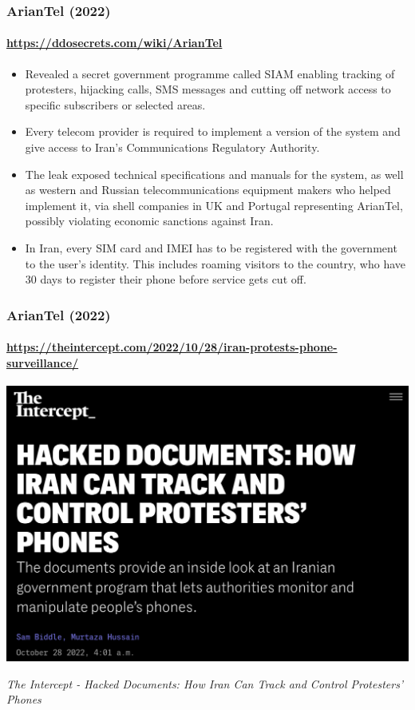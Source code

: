 \documentclass[aspectratio=169,usenames,dvipsnames]{beamer}
\begin{document}
\begin{frame}
  \frametitle{ArianTel (2022)}
  \framesubtitle{\url{https://ddosecrets.com/wiki/ArianTel}}

  \begin{itemize}[<+->]
    \item Revealed a secret government programme called SIAM enabling tracking
      of protesters, hijacking calls, SMS messages and cutting off network
      access to specific subscribers or selected areas.
    \item Every telecom provider is required to implement a version of the
      system and give access to Iran's Communications Regulatory Authority.
    \item The leak exposed technical specifications and manuals for the
      system, as well as western and Russian telecommunications equipment
      makers who helped implement it, via shell companies in UK and Portugal
      representing ArianTel, possibly violating economic sanctions
      against Iran.
    \item In Iran, every SIM card and IMEI has to be registered with the
      government to the user's identity. This includes roaming visitors to the
      country, who have 30 days to register their phone before service gets
      cut off.
  \end{itemize}
\end{frame}

\begin{frame}[c]
  \frametitle{ArianTel (2022)}
  \framesubtitle{\url{https://theintercept.com/2022/10/28/iran-protests-phone-surveillance/}}

  \footnotesize \centering

  \includegraphics[width=\textwidth,height=0.6\textheight,keepaspectratio]{img/ariantel1.png}

  \vfill
  \emph{The Intercept - Hacked Documents: How Iran Can Track and Control
  Protesters' Phones}

\end{frame}
\end{document}
